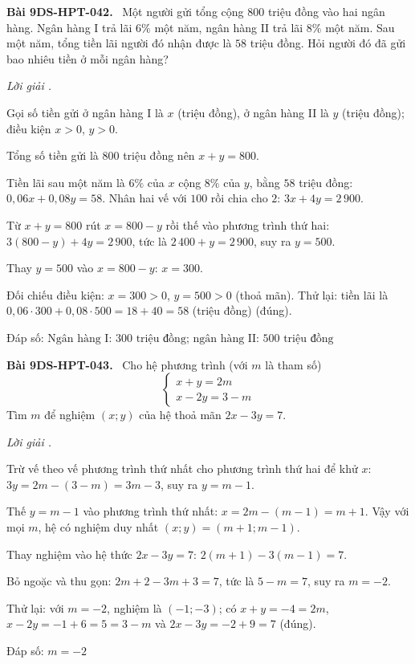 \documentclass[12pt,a4paper]{article}
\newenvironment{problem}[1][]{\par\medskip\noindent\textbf{Bài #1.}\ }{\par}
\newenvironment{solution}[1][]{\par\noindent\textit{Lời giải #1.}\par}{\par}
\begin{document}
\begin{problem}[9DS-HPT-042]
Một người gửi tổng cộng $800$ triệu đồng vào hai ngân hàng. Ngân hàng I trả lãi $6\%$ một năm, ngân hàng II trả lãi $8\%$ một năm. Sau một năm, tổng tiền lãi người đó nhận được là $58$ triệu đồng. Hỏi người đó đã gửi bao nhiêu tiền ở mỗi ngân hàng?

\begin{solution}
Gọi số tiền gửi ở ngân hàng I là $x$ (triệu đồng), ở ngân hàng II là $y$ (triệu đồng); điều kiện $x > 0$, $y > 0$.

Tổng số tiền gửi là $800$ triệu đồng nên $x + y = 800$.

Tiền lãi sau một năm là $6\%$ của $x$ cộng $8\%$ của $y$, bằng $58$ triệu đồng: $0{,}06x + 0{,}08y = 58$. Nhân hai vế với $100$ rồi chia cho $2$: $3x + 4y = 2\,900$.

Từ $x + y = 800$ rút $x = 800 - y$ rồi thế vào phương trình thứ hai: $3(800 - y) + 4y = 2\,900$, tức là $2\,400 + y = 2\,900$, suy ra $y = 500$.

Thay $y = 500$ vào $x = 800 - y$: $x = 300$.

Đối chiếu điều kiện: $x = 300 > 0$, $y = 500 > 0$ (thoả mãn). Thử lại: tiền lãi là $0{,}06 \cdot 300 + 0{,}08 \cdot 500 = 18 + 40 = 58$ (triệu đồng) (đúng).

Đáp số: $\boxed{\text{Ngân hàng I: } 300 \text{ triệu đồng; ngân hàng II: } 500 \text{ triệu đồng}}$
\end{solution}
\end{problem}

\begin{problem}[9DS-HPT-043]
Cho hệ phương trình (với $m$ là tham số)
\[ \begin{cases} x + y = 2m \\ x - 2y = 3 - m \end{cases} \]
Tìm $m$ để nghiệm $(x; y)$ của hệ thoả mãn $2x - 3y = 7$.

\begin{solution}
Trừ vế theo vế phương trình thứ nhất cho phương trình thứ hai để khử $x$: $3y = 2m - (3 - m) = 3m - 3$, suy ra $y = m - 1$.

Thế $y = m - 1$ vào phương trình thứ nhất: $x = 2m - (m - 1) = m + 1$. Vậy với mọi $m$, hệ có nghiệm duy nhất $(x; y) = (m + 1; m - 1)$.

Thay nghiệm vào hệ thức $2x - 3y = 7$: $2(m + 1) - 3(m - 1) = 7$.

Bỏ ngoặc và thu gọn: $2m + 2 - 3m + 3 = 7$, tức là $5 - m = 7$, suy ra $m = -2$.

Thử lại: với $m = -2$, nghiệm là $(-1; -3)$; có $x + y = -4 = 2m$, $x - 2y = -1 + 6 = 5 = 3 - m$ và $2x - 3y = -2 + 9 = 7$ (đúng).

Đáp số: $\boxed{m = -2}$
\end{solution}
\end{problem}
\end{document}
